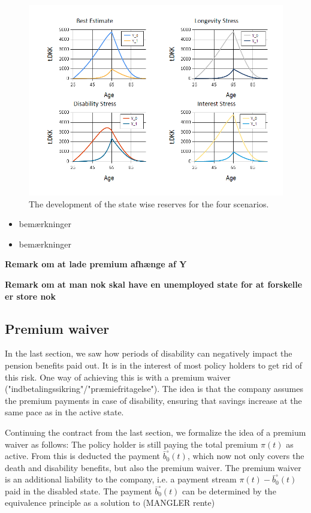 \documentclass{book}
\newcommand{\1}[1]{\mathbbm{1}_{\left\lbrace #1 \right\rbrace}}
\theoremstyle{break}
\theoremstyle{remark}
\numberwithin{equation}{section}
\begin{document}
\begin{figure}[H]
	\centering
	\caption{The development of the state wise reserves for the four scenarios.}
	\includegraphics[width=\textwidth]{Reserves}
\end{figure}

\begin{itemize}
	\item bemærkninger
\end{itemize}



\begin{itemize}
	\item bemærkninger
\end{itemize}

\textbf{Remark om at lade premium afhænge af Y}

\textbf{Remark om at man nok skal have en unemployed state for at forskelle er store nok}

\subsection{Premium waiver}

In the last section, we saw how periods of disability can negatively impact the pension benefits paid out. It is in the interest of most policy holders to get rid of this risk. One way of achieving this is with a premium waiver ("indbetalingssikring"/"præmiefritagelse"). The idea is that the company assumes the premium payments in case of disability, ensuring that savings increase at the same pace as in the active state.

Continuing the contract from the last section, we formalize the idea of a premium waiver as follows: The policy holder is still paying the total premium $\pi(t)$ as active. From this is deducted the payment $\bar{b}_0^\circ(t)$, which now not only covers the death and disability benefits, but also the premium waiver. The premium waiver is an additional liability to the company, i.e. a payment stream $\pi(t) - \bar{b}_0^\circ(t)$ paid in the disabled state. The payment $\bar{b}_0^\circ(t)$ can be determined by the equivalence principle as a solution to (MANGLER rente)
\end{document}

